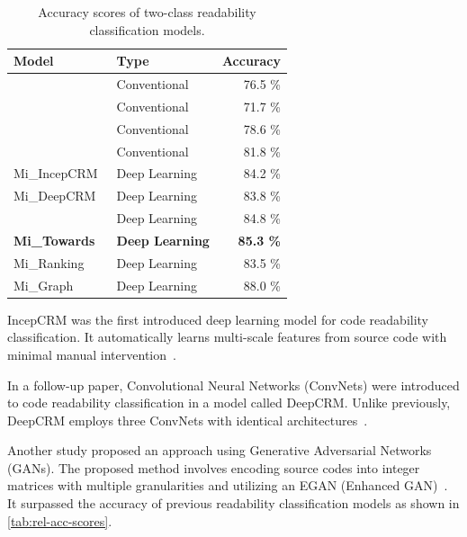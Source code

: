 \documentclass[%
class=scrreprt,
chapterprefix=false,%
open=right,%
twoside=true,%
paper=a4,%
logofile={Logo\_zentral\_farbig\_EN.png},%
thesistype=master,%
UKenglish,%
]{se2thesis}
\theoremstyle{definition}
\begin{document}
	\begin{table}[tb]
		\centering
		\caption{Accuracy scores of two-class readability classification models.}
		\label{tab:rel-acc-scores}
		\begin{tabular}{llr}
			\toprule
			Model & Type & Accuracy \\
			\midrule
			\citeauthor{buse2009learning}~\cite{buse2009learning} & Conventional & 76.5 \% \\
			\citeauthor{posnett2011simpler}~\cite{posnett2011simpler} & Conventional & 71.7 \% \\
			\citeauthor{dorn2012general}~\cite{dorn2012general} & Conventional & 78.6 \% \\
			\citeauthor{scalabrino2018comprehensive}~\cite{scalabrino2018comprehensive} & Conventional & 81.8 \% \\
			Mi\_IncepCRM~\cite{mi2018inception} & Deep Learning & 84.2 \% \\
			Mi\_DeepCRM~\cite{mi2018improving} & Deep Learning & 83.8 \% \\
			\citeauthor{sharma2020egan}~\cite{sharma2020egan} & Deep Learning & 84.8 \% \\
			\textbf{Mi\_Towards~\cite{mi2022towards}} & \textbf{Deep Learning} & \textbf{85.3 \%} \\
			Mi\_Ranking~\cite{mi2022rank} & Deep Learning & 83.5 \% \\
			Mi\_Graph~\cite{mi2023graph} & Deep Learning & 88.0 \% \\
			\bottomrule
		\end{tabular}
	\end{table}
	
	IncepCRM was the first introduced deep learning model for code readability classification. It automatically learns multi-scale features from source code with minimal manual intervention~\cite{mi2018inception}.
	
	In a follow-up paper, Convolutional Neural Networks (ConvNets) were introduced to code readability classification in a model called DeepCRM. Unlike previously, DeepCRM employs three ConvNets with identical architectures~\cite{mi2018improving}.
		
	Another study proposed an approach using Generative Adversarial Networks (GANs). The proposed method involves encoding source codes into integer matrices with multiple granularities and utilizing an EGAN (Enhanced GAN)~\cite{sharma2020egan}. It surpassed the accuracy of previous readability classification models as shown in \autoref{tab:rel-acc-scores}.
	
\end{document}
